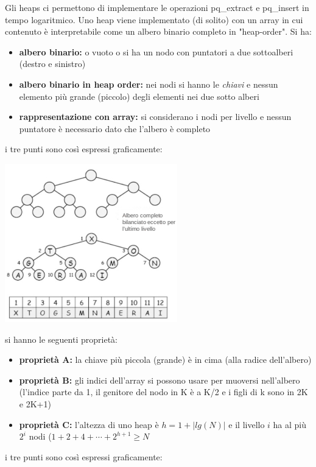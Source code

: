 \documentclass[a4paper,12pt, oneside]{book}
\begin{document}
Gli heaps ci permettono di implementare le operazioni pq\_extract e pq\_insert
in tempo logaritmico. Uno heap viene implementato (di solito) con un array in cui contenuto è
interpretabile come un albero binario completo in "heap-order". Si ha:
\begin{itemize}
	\item \textbf{albero binario:} o vuoto o si ha un nodo con puntatori a due sottoalberi
	      (destro e sinistro)
	\item \textbf{albero binario in heap order:} nei nodi si hanno le \textit{chiavi} e nessun elemento più grande (piccolo)
	      degli elementi nei due sotto alberi
	\item \textbf{rappresentazione con array:} si considerano i nodi per livello e nessun puntatore è necessario dato
	      che l'albero è completo
\end{itemize}
i tre punti sono così espressi graficamente:
\begin{center}
	\includegraphics[scale=3]{img/c7.png}
\end{center}
si hanno le seguenti proprietà:
\begin{itemize}
	\item \textbf{proprietà A:} la chiave più piccola
	      (grande) è in cima (alla radice
	      dell'albero)
	\item \textbf{proprietà B:} gli indici dell'array si
	      possono usare per muoversi
	      nell'albero (l'indice parte da 1, il genitore del nodo in K è a K/2 e i figli di k sono in 2K e 2K+1)
	\item \textbf{proprietà C:} l'altezza di uno heap è $h=1+|lg(N)|$ e il livello $i$ ha al più $2^i$ nodi ($1+2+4+\cdots+2^{h+1}\geq N$
\end{itemize}
i tre punti sono così espressi graficamente:
\end{document}

